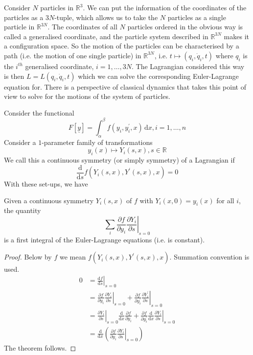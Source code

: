 \begin{example}
    Consider $N$ particles in $\mathbb R^3$.
    We can put the information of the coordinates of the particles as a $3N$-tuple, which allows us to take the $N$ particles as a single particle in $\mathbb R^{3N}$.
    The coordinates of all $N$ particles ordered in the obvious way is called a generalised coordinate, and the particle system described in $\mathbb R^{3N}$ makes it a configuration space.
    So the motion of the particles can be characterised by a path (i.e. the motion of one single particle) in $\mathbb R^{3N}$, i.e. $t\mapsto (q_i,\dot{q}_i,t)$ where $q_i$ is the $i^{th}$ generalised coordinate, $i=1,\ldots,3N$.
    The Lagrangian considered this way is then $L=L(q_i,\dot{q}_i,t)$ which we can solve the corresponding Euler-Lagrange equation for.
    There is a perspective of classical dynamics that takes this point of view to solve for the motions of the system of particles.
\end{example}
Consider the functional
$$F[\underline{y}]=\int_\alpha^\beta f(y_i,y_i^\prime,x)\,\mathrm dx,i=1,\ldots,n$$
Consider a $1$-parameter family of transformations
$$y_i(x)\mapsto Y_i(s,x),s\in\mathbb R$$
We call this a continuous symmetry (or simply symmetry) of a Lagrangian if
$$\frac{\mathrm d}{\mathrm ds}f(Y_i(s,x),Y^\prime(s,x),x)=0$$
With these set-ups, we have
\begin{theorem}
    Given a continuous symmetry $Y_i(s,x)$ of $f$ with $Y_i(x,0)=y_i(x)$ for all $i$, the quantity
    $$\sum_i\frac{\partial f}{\partial y_i}\left.\frac{\partial Y_i}{\partial s}\right|_{s=0}$$
    is a first integral of the Euler-Lagrange equations (i.e. is constant).
\end{theorem}
\begin{proof}
    Below by $f$ we mean $f(Y_i(s,x),Y^\prime(s,x),x)$.
    Summation convention is used.
    \begin{align*}
        0&=\left.\frac{\mathrm df}{\mathrm ds}\right|_{s=0}\\
        &=\frac{\partial f}{\partial y_i}\left.\frac{\partial Y_i}{\partial s}\right|_{s=0}+\frac{\partial f}{\partial y_i^\prime}\left.\frac{\partial Y_i^\prime}{\partial s}\right|_{s=0}\\
        &=\left.\frac{\partial Y_i}{\partial s}\right|_{s=0}\frac{\mathrm d}{\mathrm dx}\frac{\partial f}{\partial y_i}+\frac{\partial f}{\partial y_i^\prime}\left.\frac{\mathrm d}{\mathrm dx}\frac{\partial Y_i}{\partial s}\right|_{s=0}\\
        &=\frac{\mathrm d}{\mathrm dx}\left( \frac{\partial f}{\partial y_i}\left.\frac{\partial Y_i}{\partial s}\right|_{s=0} \right)
    \end{align*}
    The theorem follows.
\end{proof}
